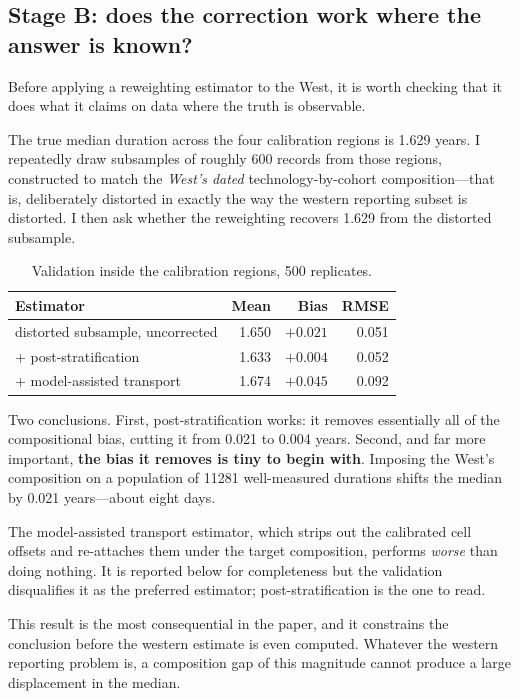 \documentclass[11pt,a4paper]{article}
\begin{document}
\subsection{Stage B: does the correction work where the answer is known?}

Before applying a reweighting estimator to the West, it is worth checking that it
does what it claims on data where the truth is observable.

The true median duration across the four calibration regions is 1.629 years. I
repeatedly draw subsamples of roughly 600 records from those regions, constructed
to match the \emph{West's dated} technology-by-cohort composition---that is,
deliberately distorted in exactly the way the western reporting subset is
distorted. I then ask whether the reweighting recovers 1.629 from the distorted
subsample.

\begin{table}[htbp]
\centering
\caption{Validation inside the calibration regions, 500 replicates.}
\begin{tabular}{lrrr}
\toprule
Estimator & Mean & Bias & RMSE \\
\midrule
distorted subsample, uncorrected & 1.650 & $+0.021$ & 0.051 \\
\quad + post-stratification      & 1.633 & $+0.004$ & 0.052 \\
\quad + model-assisted transport & 1.674 & $+0.045$ & 0.092 \\
\bottomrule
\end{tabular}
\end{table}

Two conclusions. First, post-stratification works: it removes essentially all of
the compositional bias, cutting it from 0.021 to 0.004 years. Second, and far
more important, \textbf{the bias it removes is tiny to begin with}. Imposing the
West's composition on a population of \num{11281} well-measured durations shifts
the median by 0.021 years---about eight days.

The model-assisted transport estimator, which strips out the calibrated cell
offsets and re-attaches them under the target composition, performs \emph{worse}
than doing nothing. It is reported below for completeness but the validation
disqualifies it as the preferred estimator; post-stratification is the one to
read.

This result is the most consequential in the paper, and it constrains the
conclusion before the western estimate is even computed. Whatever the western
reporting problem is, a composition gap of this magnitude cannot produce a large
displacement in the median.
\end{document}
